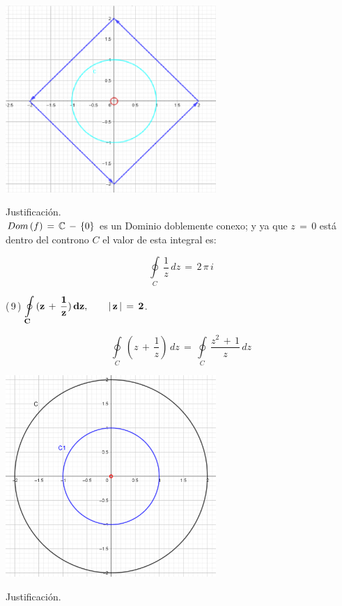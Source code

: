\documentclass[a4paper,11pt,openany]{book}
\begin{document}
\begin{center}
     \includegraphics[width=8cm]{Gra-Ej-8.png}
\end{center}

\textcolor{ao(english)}{} Justificación.\\

$\mathnormal{Dom\,(f)}\,=\,\mathbb C\,-\,\{0\}$ es un Dominio doblemente conexo; y ya que $z\,=\,0$ está dentro del controno $C$ el valor de esta integral es:

$$\displaystyle\oint\limits_{C}\,\dfrac{1}{z}\,dz\,=\,2\,\pi\,i$$

\textcolor{ao(english)}{(\,9\,)} $\bf{\displaystyle\oint\limits_{C}\,(z\,+\,\dfrac{1}{z})\,dz}, \qquad |\,z\,|\,=\,2$.

$$\displaystyle\oint\limits_{C}\,(z\,+\,\dfrac{1}{z})\,dz\,=\,\displaystyle\oint\limits_{C}\,\dfrac{z^{2}\,+\,1}{z}\,dz$$

\begin{center}
     \includegraphics[width=8cm]{Gra-Ej-9.png}
\end{center}

\textcolor{ao(english)}{} Justificación.\\
\end{document}
